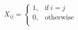\documentclass[10pt]{article}
\begin{document}
\begin{align*}X_{ij} = 
\begin{cases}
1, & \text{if}\ i = j \\
0, & \text{otherwise} \\
\end{cases}\end{align*}
\end{document}
